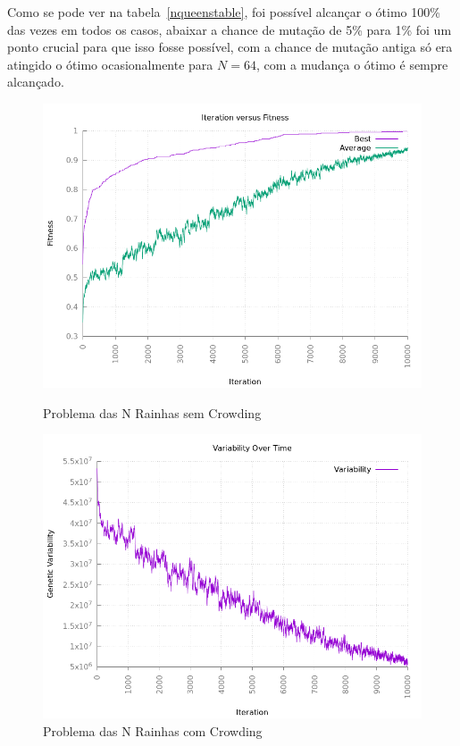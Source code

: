 \documentclass[12pt]{article}
\begin{document}
Como se pode ver na tabela~\ref{nqueenstable}, foi possível alcançar o ótimo 100\% das 
vezes em todos os casos, abaixar a chance de mutação de 5\% para 1\% foi um ponto crucial 
para que isso fosse possível, com a chance de mutação antiga só era atingido o ótimo 
ocasionalmente para $N = 64$, com a mudança o ótimo é sempre alcançado.

\begin{figure}[h!]
    \centering
    \begin{minipage}{0.47\textwidth}
        \centering
        \includegraphics[width=\textwidth]{pictures/10exec64queensconvergence}
        \caption{Problema das N Rainhas sem Crowding}
        \label{10execconv}
    \end{minipage}
    \begin{minipage}{0.47\textwidth}
        \centering
        \includegraphics[width=\textwidth]{pictures/10exec64queensvariability}
        \caption{Problema das N Rainhas com Crowding}
        \label{10execvar}
    \end{minipage}
\end{figure}
\end{document}
